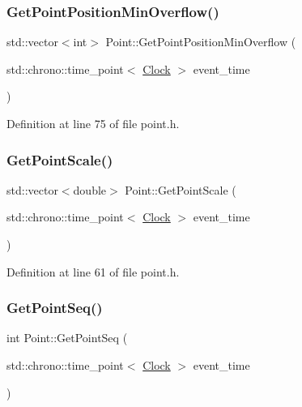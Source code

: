 \subsubsection{\texorpdfstring{Get\+Point\+Position\+Min\+Overflow()}{GetPointPositionMinOverflow()}}
{\footnotesize\ttfamily std\+::vector$<$int$>$ Point\+::\+Get\+Point\+Position\+Min\+Overflow (\begin{DoxyParamCaption}\item[{std\+::chrono\+::time\+\_\+point$<$ \hyperlink{universe_8h_a0ef8d951d1ca5ab3cfaf7ab4c7a6fd80}{Clock} $>$}]{event\+\_\+time }\end{DoxyParamCaption})\hspace{0.3cm}{\ttfamily [inline]}}



Definition at line 75 of file point.\+h.

\mbox{\label{class_point_acdd393f39d8c08aff1e866ce1c5585e5}} 
\subsubsection{\texorpdfstring{Get\+Point\+Scale()}{GetPointScale()}}
{\footnotesize\ttfamily std\+::vector$<$double$>$ Point\+::\+Get\+Point\+Scale (\begin{DoxyParamCaption}\item[{std\+::chrono\+::time\+\_\+point$<$ \hyperlink{universe_8h_a0ef8d951d1ca5ab3cfaf7ab4c7a6fd80}{Clock} $>$}]{event\+\_\+time }\end{DoxyParamCaption})\hspace{0.3cm}{\ttfamily [inline]}}



Definition at line 61 of file point.\+h.

\mbox{\label{class_point_a04bae1bb3475d1e5d97ddd7b2dae40aa}} 
\subsubsection{\texorpdfstring{Get\+Point\+Seq()}{GetPointSeq()}}
{\footnotesize\ttfamily int Point\+::\+Get\+Point\+Seq (\begin{DoxyParamCaption}\item[{std\+::chrono\+::time\+\_\+point$<$ \hyperlink{universe_8h_a0ef8d951d1ca5ab3cfaf7ab4c7a6fd80}{Clock} $>$}]{event\+\_\+time }\end{DoxyParamCaption})\hspace{0.3cm}{\ttfamily [inline]}}

